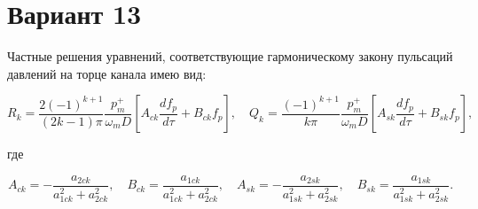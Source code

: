 \documentclass{article}
\begin{document}
\section*{Вариант 13}

Частные решения уравнений, соответствующие гармоническому закону пульсаций давлений на торце канала имею вид:

\begin{equation}
    R_k = \frac{2 (-1)^{k+1}}{(2 k - 1) \pi} \frac{p^+_m}{\omega_m D} \left[A_{ck} \frac{df_p}{d\tau} + B_{ck}f_p \right] , \quad Q_k = \frac{(-1)^{k+1}}{k\pi} \frac{p^+_m}{\omega_m D} \left[A_{sk} \frac{df_p}{d\tau} + B_{sk}f_p \right] ,
\end{equation}

где

\begin{equation*}
    A_{ck} = - \frac{a_{2ck}}{a^2_{1ck} + a^2_{2ck}} , \quad B_{ck} = \frac{a_{1ck}}{a^2_{1ck} + a^2_{2ck}}, \quad A_{sk} = - \frac{a_{2sk}}{a^2_{1sk} + a^2_{2sk}} , \quad B_{sk} = \frac{a_{1sk}}{a^2_{1sk} + a^2_{2sk}} .
\end{equation*}
\end{document}
